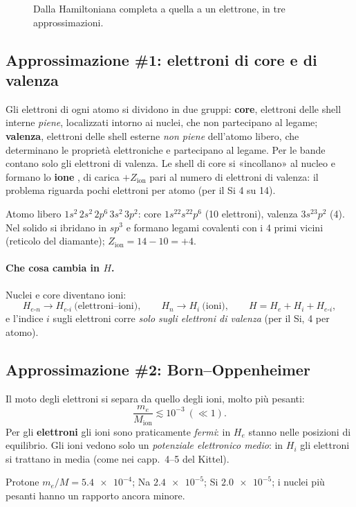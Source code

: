 \documentclass[11pt,a4paper]{article}
\begin{document}
\begin{figure}[tbp]
\centering
{}
\caption{Dalla Hamiltoniana completa a quella a un elettrone, in tre approssimazioni.}\label{fig:approx}
\end{figure}

\subsection{Approssimazione \#1: elettroni di core e di valenza}\label{sec:approx1}
\begin{approssimazione}
Gli elettroni di ogni atomo si dividono in due gruppi:
\textbf{core}, elettroni delle shell interne \emph{piene}, localizzati intorno ai nuclei, che non partecipano al legame;
\textbf{valenza}, elettroni delle shell esterne \emph{non piene} dell'atomo libero, che determinano le proprietà elettroniche e partecipano al legame.
Per le bande contano solo gli elettroni di valenza.
\tcblower
Le shell di core si «incollano» al nucleo e formano lo \textbf{ione} , di carica $+Z_{\mathrm{ion}}$ pari al numero di elettroni di
valenza: il problema riguarda pochi elettroni per atomo (per il Si 4 su 14).
\end{approssimazione}
\begin{esempio}[il silicio]
Atomo libero $1s^2\,2s^2\,2p^6\,3s^2\,3p^2$: core $1s^22s^22p^6$ (10 elettroni), valenza $3s^23p^2$ (4). Nel solido si ibridano in $sp^3$ e
formano legami covalenti con i 4 primi vicini (reticolo del diamante); $Z_{\mathrm{ion}}=14-10=+4$.
\end{esempio}

\paragraph{Che cosa cambia in $H$.} Nuclei e core diventano ioni:
\[
H_{e\text{-}n}\to H_{e\text{-}i}\ \text{(elettroni--ioni)},\qquad H_n\to H_i\ \text{(ioni)},\qquad H=H_e+H_i+H_{e\text{-}i},
\]
e l'indice $i$ sugli elettroni corre \emph{solo sugli elettroni di valenza} (per il Si, 4 per atomo).

\subsection{Approssimazione \#2: Born--Oppenheimer}\label{sec:BO}
\begin{approssimazione}
Il moto degli elettroni si separa da quello degli ioni, molto più pesanti:
\[
\frac{m_e}{M_{\mathrm{ion}}}\lesssim10^{-3}\ (\ll1).
\]
\tcblower
Per gli \textbf{elettroni} gli ioni sono praticamente \emph{fermi}: in $H_e$ stanno nelle posizioni di equilibrio. Gli ioni vedono solo un
\emph{potenziale elettronico medio}: in $H_i$ gli elettroni si trattano in media (come nei capp.~4--5 del Kittel).
\end{approssimazione}
\begin{esempio}
Protone $m_e/M=\num{5.4e-4}$; Na $\num{2.4e-5}$; Si $\num{2.0e-5}$; i nuclei più pesanti hanno un rapporto ancora minore.
\end{esempio}
\end{document}

